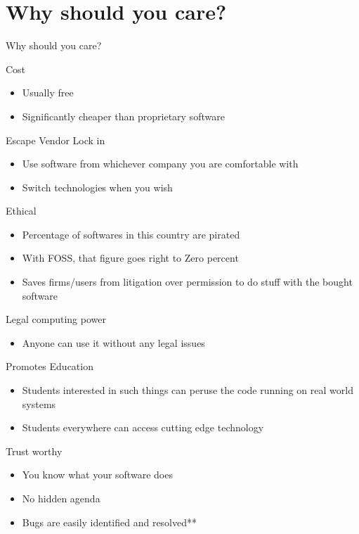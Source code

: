 \documentclass{beamer}
\begin{document}
	\section{Why should you care?}
	\begin{frame}{Why should you care?}
		\begin{block}{Cost}
			\begin{itemize}
				\item Usually free
				\item Significantly cheaper than proprietary software
			\end{itemize}
		\end{block}
		\begin{block}{Escape Vendor Lock in}
		\begin{itemize}
			\item Use software from whichever company you are comfortable with
			\item Switch technologies when you wish
		\end{itemize}
	\end{block}
		\begin{block}{Ethical}
			\begin{itemize}
				\item Percentage of softwares in this country are pirated
				\item With FOSS, that figure goes right to Zero percent
				\item Saves firms/users from litigation over permission to do stuff with the bought software
			\end{itemize}
		\end{block}
	\end{frame}
	\begin{frame}{}
		\begin{block}{Legal computing power}
			\begin{itemize}
				\item Anyone can use it without any legal issues
			\end{itemize}
		\end{block}
		\begin{block}{Promotes Education}
			\begin{itemize}
				\item Students interested in such things can peruse the code running on real world systems
				\item Students everywhere can access cutting edge technology
			\end{itemize}
		\end{block}
		\begin{block}{Trust worthy}
			\begin{itemize}
				\item You know what your software does
				\item No hidden agenda
				\item Bugs are easily identified and resolved**
			\end{itemize}
		\end{block}
	\end{frame}
\end{document}
